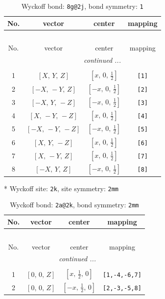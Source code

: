 \documentclass[fleqn,8pt]{jsarticle}
\begin{document}
\begin{longtable}{cccc}
\caption{Wyckoff bond: {\tt 8g@2j}, bond symmetry: {\tt 1}}
 \\
 \hline \hline
No. & vector & center & mapping \\ \hline \endfirsthead

\multicolumn{3}{l}{\tablename\ \thetable{}} \\
 \hline \hline
No. & vector & center & mapping \\ \hline \endhead

 \hline \hline
\multicolumn{3}{r}{\footnotesize\it continued ...} \\ \endfoot

 \hline \hline
\multicolumn{3}{r}{} \\ \endlastfoot

1 & $\left[ X,\, Y,\, Z \right]$ & $\left[ x,\, 0,\, \frac{1}{2} \right]$ & {\tt [1]} \\ \hline
2 & $\left[ - X,\, - Y,\, Z \right]$ & $\left[ - x,\, 0,\, \frac{1}{2} \right]$ & {\tt [2]} \\ \hline
3 & $\left[ - X,\, Y,\, - Z \right]$ & $\left[ - x,\, 0,\, \frac{1}{2} \right]$ & {\tt [3]} \\ \hline
4 & $\left[ X,\, - Y,\, - Z \right]$ & $\left[ x,\, 0,\, \frac{1}{2} \right]$ & {\tt [4]} \\ \hline
5 & $\left[ - X,\, - Y,\, - Z \right]$ & $\left[ - x,\, 0,\, \frac{1}{2} \right]$ & {\tt [5]} \\ \hline
6 & $\left[ X,\, Y,\, - Z \right]$ & $\left[ x,\, 0,\, \frac{1}{2} \right]$ & {\tt [6]} \\ \hline
7 & $\left[ X,\, - Y,\, Z \right]$ & $\left[ x,\, 0,\, \frac{1}{2} \right]$ & {\tt [7]} \\ \hline
8 & $\left[ - X,\, Y,\, Z \right]$ & $\left[ - x,\, 0,\, \frac{1}{2} \right]$ & {\tt [8]} \\
\end{longtable}
* Wyckoff site: {\tt 2k}, site symmetry: {\tt 2mm}
\renewcommand{\arraystretch}{1.2}
\begin{longtable}{cccc}
\caption{Wyckoff bond: {\tt 2a@2k}, bond symmetry: {\tt 2mm}}
 \\
 \hline \hline
No. & vector & center & mapping \\ \hline \endfirsthead

\multicolumn{3}{l}{\tablename\ \thetable{}} \\
 \hline \hline
No. & vector & center & mapping \\ \hline \endhead

 \hline \hline
\multicolumn{3}{r}{\footnotesize\it continued ...} \\ \endfoot

 \hline \hline
\multicolumn{3}{r}{} \\ \endlastfoot

1 & $\left[ 0,\, 0,\, Z \right]$ & $\left[ x,\, \frac{1}{2},\, 0 \right]$ & {\tt [1,-4,-6,7]} \\ \hline
2 & $\left[ 0,\, 0,\, Z \right]$ & $\left[ - x,\, \frac{1}{2},\, 0 \right]$ & {\tt [2,-3,-5,8]} \\
\end{longtable}
\end{document}
